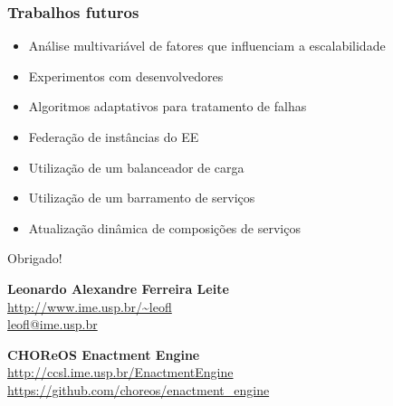 \documentclass{beamer}
\begin{document}
\begin{frame}
\frametitle{Trabalhos futuros}

\begin{itemize}
\item Análise multivariável de fatores que influenciam a escalabilidade
\item Experimentos com desenvolvedores
\item Algoritmos adaptativos para tratamento de falhas
\item Federação de instâncias do EE
\item Utilização de um balanceador de carga
\item Utilização de um barramento de serviços
\item Atualização dinâmica de composições de serviços
\end{itemize}

\end{frame}


\begin{frame}

{\Huge \centerline{Obrigado! }}

\vspace{1cm}

\textbf{Leonardo Alexandre Ferreira Leite} \\
\url{http://www.ime.usp.br/~leofl} \\
\url{leofl@ime.usp.br} \\

\vspace{0.6cm}

\textbf{CHOReOS Enactment Engine} \\
\url{http://ccsl.ime.usp.br/EnactmentEngine} \\
\url{https://github.com/choreos/enactment_engine}
\end{frame}

\end{document}
